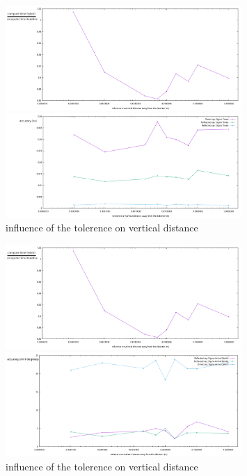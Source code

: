 \documentclass[11pt,a4paper,faculty=we,language=en,doctype=report]{cls/ugent-doc}
\begin{document}
\begin{figure}
	\centering
	\begin{minipage}{\textwidth}
		\includegraphics[width=0.8\textwidth]{figures/ZtolVsTime2.pdf}
	\end{minipage}
	\begin{minipage}{\textwidth}
		\includegraphics[width=0.8\textwidth]{figures/ZtolVsSigmaTime.pdf}
	\end{minipage}
\caption{influence of the tolerence on vertical distance}
\label{fig:ztolinfl}
\end{figure}

\begin{figure}
	\centering
	\begin{minipage}{\textwidth}
		\includegraphics[width=0.8\textwidth]{figures/ZtolVsTime2.pdf}
	\end{minipage}
	\begin{minipage}{\textwidth}
		\includegraphics[width=0.8\textwidth]{figures/ZtolVsSigmaAZ.pdf}
	\end{minipage}
\caption{influence of the tolerence on vertical distance}
\label{fig:ztolinfl2}
\end{figure}
\end{document}
